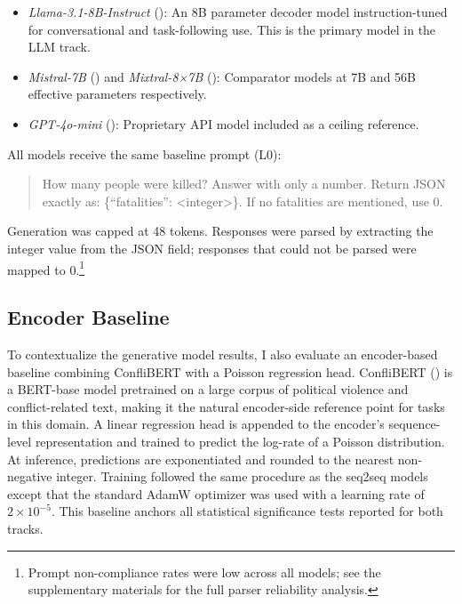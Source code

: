 \documentclass[
  11pt,
]{article}
\providecommand{\tightlist}{%
  \setlength{\itemsep}{0pt}\setlength{\parskip}{0pt}}
\begin{document}
\begin{itemize}
\tightlist
\item
  \emph{Llama-3.1-8B-Instruct} (): An 8B parameter decoder model instruction-tuned for
  conversational and task-following use. This is the primary model in
  the LLM track.
\item
  \emph{Mistral-7B} ()
  and \emph{Mixtral-8×7B} (): Comparator models at 7B and 56B effective parameters
  respectively.
\item
  \emph{GPT-4o-mini} ():
  Proprietary API model included as a ceiling reference.
\end{itemize}

All models receive the same baseline prompt (L0):

\begin{quote}
How many people were killed? Answer with only a number. Return JSON
exactly as: \{``fatalities'': \textless integer\textgreater\}. If no
fatalities are mentioned, use 0.
\end{quote}

Generation was capped at 48 tokens. Responses were parsed by extracting
the integer value from the JSON field; responses that could not be
parsed were mapped to 0.\footnote{Prompt non-compliance rates were low
  across all models; see the supplementary materials for the full parser
  reliability analysis.}

\subsection{Encoder Baseline}\label{encoder-baseline}

To contextualize the generative model results, I also evaluate an
encoder-based baseline combining ConfliBERT with a Poisson regression
head. ConfliBERT () is a BERT-base
model pretrained on a large corpus of political violence and
conflict-related text, making it the natural encoder-side reference
point for tasks in this domain. A linear regression head is appended to
the encoder's sequence-level representation and trained to predict the
log-rate of a Poisson distribution. At inference, predictions are
exponentiated and rounded to the nearest non-negative integer. Training
followed the same procedure as the seq2seq models except that the
standard AdamW optimizer was used with a learning rate of
\(2 \times 10^{-5}\). This baseline anchors all statistical significance
tests reported for both tracks.
\end{document}

